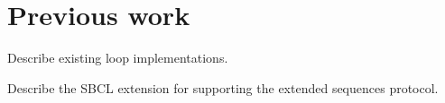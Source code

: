 \section{Previous work}

Describe existing loop implementations.

Describe the SBCL extension for supporting the extended sequences
protocol.
